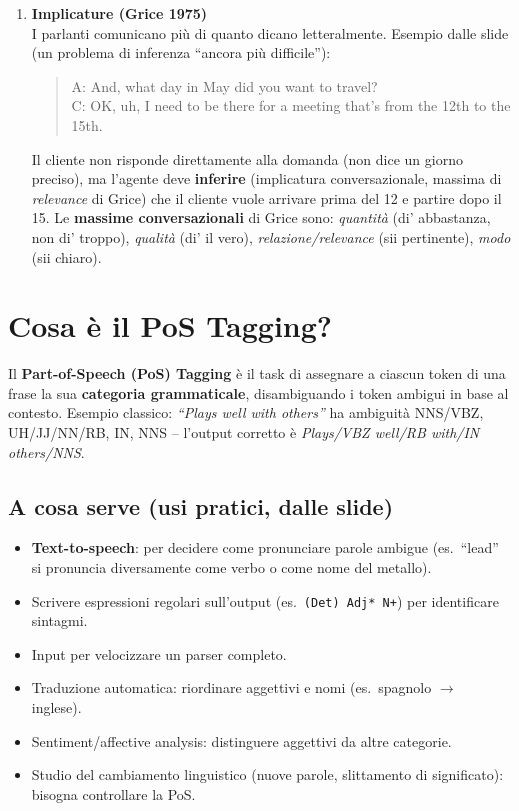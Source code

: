 \documentclass[12pt,a4paper]{article}
\begin{document}
\begin{enumerate}[leftmargin=1.5em, label=\textbf{\arabic*.}]
  \item \textbf{Implicature (Grice 1975)}\\
    I parlanti comunicano più di quanto dicano letteralmente. Esempio dalle slide (un problema di inferenza ``ancora più difficile''):
    \begin{quote}\footnotesize
    A: And, what day in May did you want to travel?\\
    C: OK, uh, I need to be there for a meeting that's from the 12th to the 15th.
    \end{quote}
    Il cliente non risponde direttamente alla domanda (non dice un giorno preciso), ma l'agente deve \textbf{inferire} (implicatura conversazionale, massima di \emph{relevance} di Grice) che il cliente vuole arrivare prima del 12 e partire dopo il 15. Le \textbf{massime conversazionali} di Grice sono: \emph{quantità} (di' abbastanza, non di' troppo), \emph{qualità} (di' il vero), \emph{relazione/relevance} (sii pertinente), \emph{modo} (sii chiaro).

\end{enumerate}

\section{Cosa è il PoS Tagging?}

Il \textbf{Part-of-Speech (PoS) Tagging} è il task di assegnare a ciascun token di una frase la sua \textbf{categoria grammaticale}, disambiguando i token ambigui in base al contesto. Esempio classico: \textit{``Plays well with others''} ha ambiguità NNS/VBZ, UH/JJ/NN/RB, IN, NNS -- l'output corretto è \textit{Plays/VBZ well/RB with/IN others/NNS}.

\subsection{A cosa serve (usi pratici, dalle slide)}

\begin{itemize}[leftmargin=1.5em]
  \item \textbf{Text-to-speech}: per decidere come pronunciare parole ambigue (es.\ ``lead'' si pronuncia diversamente come verbo o come nome del metallo).
  \item Scrivere espressioni regolari sull'output (es.\ \texttt{(Det) Adj* N+}) per identificare sintagmi.
  \item Input per velocizzare un parser completo.
  \item Traduzione automatica: riordinare aggettivi e nomi (es.\ spagnolo $\to$ inglese).
  \item Sentiment/affective analysis: distinguere aggettivi da altre categorie.
  \item Studio del cambiamento linguistico (nuove parole, slittamento di significato): bisogna controllare la PoS.
\end{itemize}
\end{document}
